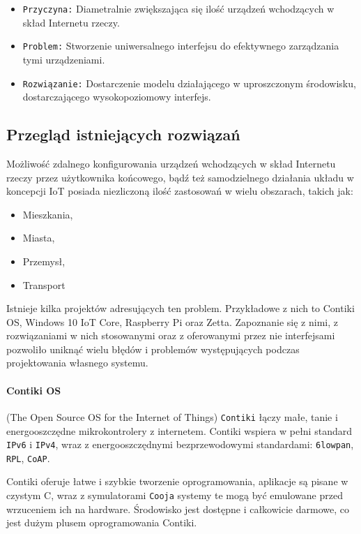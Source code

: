 \begin{itemize}
	\item \texttt{Przyczyna:} Diametralnie zwiększająca się ilość urządzeń wchodzących w skład Internetu rzeczy\cite{iot-art}.
	\item \texttt{Problem:} Stworzenie uniwersalnego interfejsu do efektywnego zarządzania tymi urządzeniami.
	\item \texttt{Rozwiązanie:} Dostarczenie modelu działającego w uproszczonym środowisku, dostarczającego wysokopoziomowy interfejs.
\end{itemize}

\subsection{Przegląd istniejących rozwiązań}
\label{sec:existing-systems}
Możliwość zdalnego konfigurowania urządzeń wchodzących w skład Internetu rzeczy przez użytkownika końcowego, bądź też samodzielnego działania układu w koncepcji IoT posiada niezliczoną ilość zastosowań w wielu obszarach, takich jak:

 \begin{itemize}
	\item Mieszkania,
	\item Miasta,
	\item Przemysł,
	\item Transport
\end{itemize}

Istnieje kilka projektów adresujących ten problem. Przykładowe z nich to Contiki OS, Windows 10 IoT Core, Raspberry Pi oraz Zetta. Zapoznanie się z nimi, z rozwiązaniami w nich stosowanymi oraz z oferowanymi przez nie interfejsami pozwoliło uniknąć wielu błędów i problemów występujących podczas projektowania własnego systemu.

\paragraph{Contiki OS}\cite{contiki-www} (The Open Source OS for the Internet of Things) \texttt{Contiki} łączy małe, tanie i energooszczędne mikrokontrolery z internetem. Contiki wspiera w pełni standard \texttt{IPv6} i \texttt{IPv4}, wraz z energooszczędnymi bezprzewodowymi standardami: \texttt{6lowpan}, \texttt{RPL}, \texttt{CoAP}. 

Contiki oferuje łatwe i szybkie tworzenie oprogramowania, aplikacje są pisane w czystym C, wraz z symulatorami \texttt{Cooja} systemy te mogą być emulowane przed wrzuceniem ich na hardware. Środowisko jest dostępne i całkowicie darmowe, co jest dużym plusem oprogramowania Contiki.

